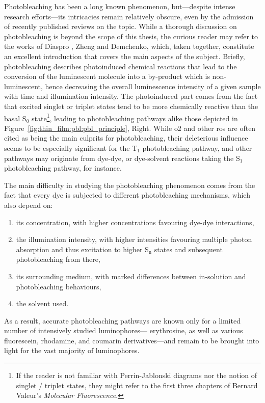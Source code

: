 Photobleaching has been a long known phenomenon, but---despite intense research efforts---its intricacies remain relatively obscure, even by the admission of recently published reviews on the topic\cite{zheng2017pbl, demchenko2020}. While a thorough discussion on photobleaching is beyond the scope of this thesis, the curious reader may refer to the works of Diaspro \etal{}\cite{diaspro2006}, Zheng \etal{}\cite{zheng2017pbl} and Demchenko\cite{demchenko2020}, which, taken together, constitute an excellent introduction that covers the main aspects of the subject. Briefly, photobleaching describes photoinduced chemical reactions that lead to the conversion of the luminescent molecule into a by-product which is non-luminescent, hence decreasing the overall luminescence intensity of a given sample with time and illumination intensity. The photoinduced part comes from the fact that excited singlet or triplet states tend to be more chemically reactive than the basal S$_0$ state\footnote{If the reader is not familiar with Perrin-Jablonski diagrams nor the notion of singlet / triplet states, they might refer to the first three chapters of Bernard Valeur's \textit{Molecular Fluorescence}\cite{valeur2012molecfluo}.}, leading to photobleaching pathways alike those depicted in Figure~\ref{fig:thin_film:pbl:pbl_principle}, Right. While \gls{o2} and other \gls{ros} are often cited as being the main culprits for photobleaching, their deleterious influence seems to be especially significant for the T$_1$ photobleaching pathway, and other pathways may originate from dye-dye, or dye-solvent reactions taking the S$_1$ photobleaching pathway, for instance\cite{hinkeldey2008}.

The main difficulty in studying the photobleaching phenomenon comes from the fact that every dye is subjected to different photobleaching mechanisms, which also depend on:
\begin{enumerate}
	\item its concentration, with higher concentrations favouring dye-dye interactions\cite{song1997},
	\item the illumination intensity, with higher intensities favouring multiple photon absorption and thus excitation to higher S$_\text{n}$ states and subsequent photobleaching from there\cite{widengren1996},
	\item its surrounding medium, with marked differences between in-solution and \invitro{} photobleaching behaviours\cite{widengren1996},
	\item the solvent used\cite{woodford2017}.
\end{enumerate}
As a result, accurate photobleaching pathways are known only for a limited number of intensively studied luminophores---\eg{} erythrosine, as well as various fluorescein, rhodamine, and coumarin derivatives\cite{zheng2017pbl, song1995, karlsson2017}---and remain to be brought into light for the vast majority of luminophores.

